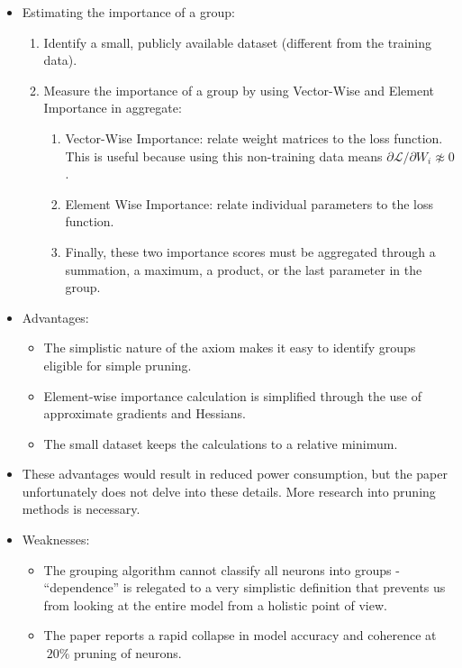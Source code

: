 \begin{itemize}
\begin{itemize}
        \item Estimating the importance of a group:
        \begin{enumerate}
            \item Identify a small, publicly available dataset (different from the training data).
            \item Measure the importance of a group by using Vector-Wise and Element Importance in aggregate:
            \begin{enumerate}
                \item Vector-Wise Importance: relate weight matrices to the loss function.
                This is useful because using this non-training data means ${\partial \mathcal{L}}/{\partial W_i} \not \approx 0$.
                \item Element Wise Importance: relate individual parameters to the loss function.
                \item Finally, these two importance scores must be aggregated through a summation, a maximum, a product, or the last parameter in the group.
            \end{enumerate}
        \end{enumerate}
        \item Advantages:
        \begin{itemize}
            \item The simplistic nature of the axiom makes it easy to identify groups eligible for simple pruning.
            \item Element-wise importance calculation is simplified through the use of approximate gradients and Hessians.
            \item The small dataset keeps the calculations to a relative minimum.
        \end{itemize}
        \item These advantages would result in reduced power consumption, but the paper unfortunately does not delve into these details.
        More research into pruning methods is necessary.
        \item Weaknesses:
        \begin{itemize}
            \item The grouping algorithm cannot classify all neurons into groups - ``dependence'' is relegated to a very simplistic definition that prevents us from looking at the entire model from a holistic point of view.
            \item The paper reports a rapid collapse in model accuracy and coherence at $~20\%$ pruning of neurons.

\end{itemize}
\end{itemize}
\end{itemize}
